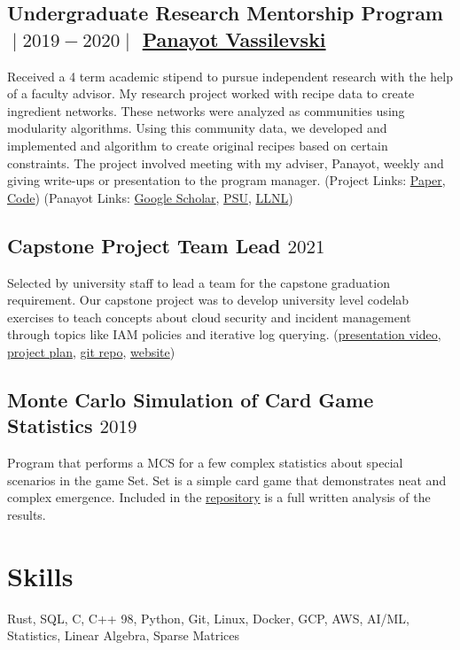 \documentclass{article}
\begin{document}
\subsection{Undergraduate Research Mentorship Program $\;\vert\;2019-2020\;\vert\;$ \href{https://scholar.google.com/citations?user=GhpkHDAAAAAJ&hl=en}{Panayot Vassilevski}}
Received a 4 term academic stipend to pursue independent research with the help of a faculty advisor.
My research project worked with recipe data to create ingredient networks. 
These networks were analyzed as communities using modularity algorithms. Using this community data,
we developed and implemented and algorithm to create original recipes based on certain constraints.
The project involved meeting with my adviser, Panayot, weekly and giving write-ups or presentation to the program manager.
(Project Links: \href{https://github.com/aujxn/research/blob/master/paper/Cullinary_Computation_paper.pdf}{Paper}, \href{https://github.com/aujxn/recipe_analysis}{Code})
(Panayot Links: \href{https://scholar.google.com/citations?user=GhpkHDAAAAAJ&hl=en}{Google Scholar}, \href{http://web.pdx.edu/~panayot/}{PSU}, \href{https://people.llnl.gov/vassilevski1}{LLNL})

\subsection{Capstone Project Team Lead $2021$}
Selected by university staff to lead a team for the capstone graduation requirement. Our
capstone project was to develop university level codelab exercises to teach concepts about cloud security
and incident management through topics like IAM policies and iterative log querying.
(\href{link}{presentation video}, \href{link}{project plan}, \href{https://github.com/NicholasSpringer/thunder-ctf/tree/master/core/levels/defender}{git repo}, \href{link}{website})

\subsection{Monte Carlo Simulation of Card Game Statistics $2019$}
Program that performs a MCS for a few complex statistics about special scenarios in the game Set. Set is a simple card game that demonstrates neat
and complex emergence. Included in the \href{https://github.com/aujxn/set_game_simulator}{repository} is a full written analysis of the results.

\section{Skills}
Rust, SQL, C, C++ 98, Python, Git, Linux, Docker, GCP, AWS, AI/ML, Statistics, Linear Algebra, Sparse Matrices
\end{document}
